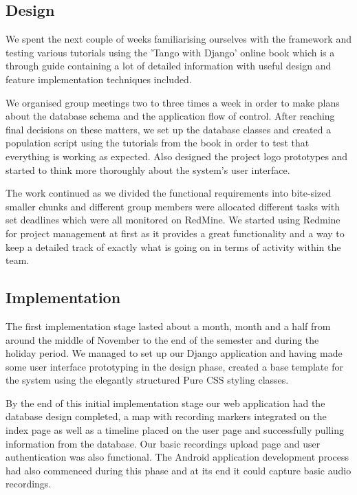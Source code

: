 \documentclass{l3proj}
\begin{document}
\subsection{Design}

We spent the next couple of weeks familiarising ourselves with the framework and testing various tutorials using the 'Tango with Django' online book which is a through guide containing a lot of detailed information with useful design and feature implementation techniques included.

We organised group meetings two to three times a week in order to make plans about the database schema and the application flow of control. After reaching final decisions on these matters, we set up the database classes and created a population script using the tutorials from the book in order to test that everything is working as expected. Also designed the project logo prototypes and started to think more thoroughly about the system's user interface.

The work continued as we divided the functional requirements into bite-sized smaller chunks and different group members were allocated different tasks with set deadlines which were all monitored on RedMine. We started using Redmine for project management at first as it provides a great functionality and a way to keep a detailed track of exactly what is going on in terms of activity within the team.


\subsection{Implementation}

The first implementation stage lasted about a month, month and a half from around the middle of November to the end of the semester and during the holiday period.
 We managed to set up our Django application and having made some user interface prototyping in the design phase, created a base template for the system using the elegantly structured Pure CSS styling classes.

By the end of this initial implementation stage our web application had the database design completed, a map with recording markers integrated on the index page as well as a timeline placed on the user page and successfully pulling information from the database.
 Our basic recordings upload page and user authentication was also functional. The Android application development process had also commenced during this phase and at its end it could capture basic audio recordings.
\end{document}

